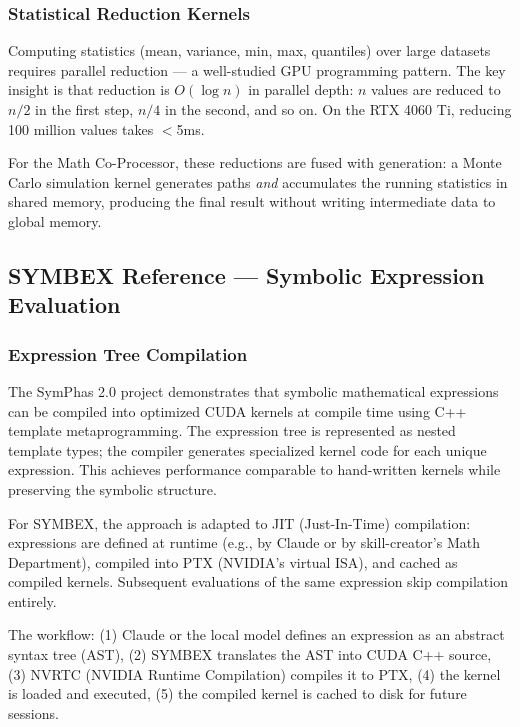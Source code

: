 \documentclass[11pt,letterpaper]{article}
\begin{document}
\subsubsection{Statistical Reduction Kernels}

Computing statistics (mean, variance, min, max, quantiles) over large datasets requires parallel reduction --- a well-studied GPU programming pattern. The key insight is that reduction is $O(\log n)$ in parallel depth: $n$ values are reduced to $n/2$ in the first step, $n/4$ in the second, and so on. On the RTX 4060 Ti, reducing 100 million values takes $<$5ms.

For the Math Co-Processor, these reductions are fused with generation: a Monte Carlo simulation kernel generates paths \textit{and} accumulates the running statistics in shared memory, producing the final result without writing intermediate data to global memory.

\subsection{SYMBEX Reference --- Symbolic Expression Evaluation}

\subsubsection{Expression Tree Compilation}

The SymPhas 2.0 project demonstrates that symbolic mathematical expressions can be compiled into optimized CUDA kernels at compile time using C++ template metaprogramming. The expression tree is represented as nested template types; the compiler generates specialized kernel code for each unique expression. This achieves performance comparable to hand-written kernels while preserving the symbolic structure.

For SYMBEX, the approach is adapted to JIT (Just-In-Time) compilation: expressions are defined at runtime (e.g., by Claude or by skill-creator's Math Department), compiled into PTX (NVIDIA's virtual ISA), and cached as compiled kernels. Subsequent evaluations of the same expression skip compilation entirely.

The workflow: (1) Claude or the local model defines an expression as an abstract syntax tree (AST), (2) SYMBEX translates the AST into CUDA C++ source, (3) NVRTC (NVIDIA Runtime Compilation) compiles it to PTX, (4) the kernel is loaded and executed, (5) the compiled kernel is cached to disk for future sessions.
\end{document}
